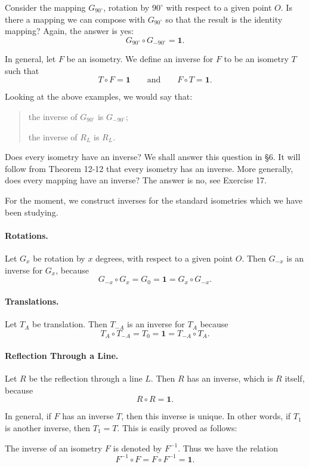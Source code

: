 \documentclass[12pt]{book} %
\begin{document}
\begin{ExerciseList}
Consider the mapping $G_{90^\circ}$, rotation by $90^\circ$ with respect to a given point $O$. Is there a mapping we can compose with $G_{90^\circ}$ so that the result is the identity mapping? Again, the answer is yes:
\[
G_{90^\circ}\circ G_{-90^\circ}=\mathbf{1}.
\]

In general, let $F$ be an isometry. We define an inverse for $F$ to be an isometry $T$ such that
\[
T\circ F=\mathbf{1}
\qquad \text{and} \qquad
F\circ T=\mathbf{1}.
\]

Looking at the above examples, we would say that:
\begin{quote}
the inverse of $G_{90^\circ}$ is $G_{-90^\circ}$;

the inverse of $R_L$ is $R_L$.
\end{quote}

Does every isometry have an inverse? We shall answer this question in \S6. It will follow from Theorem 12-12 that every isometry has an inverse. More generally, does every mapping have an inverse? The answer is no, see Exercise 17.

For the moment, we construct inverses for the standard isometries which we have been studying.

\paragraph{Rotations.}
Let $G_x$ be rotation by $x$ degrees, with respect to a given point $O$. Then $G_{-x}$ is an inverse for $G_x$, because
\[
G_{-x}\circ G_x=G_0=\mathbf{1}=G_x\circ G_{-x}.
\]

\paragraph{Translations.}
Let $T_A$ be translation. Then $T_{-A}$ is an inverse for $T_A$ because
\[
T_A\circ T_{-A}=T_0=\mathbf{1}=T_{-A}\circ T_A.
\]

\paragraph{Reflection Through a Line.}
Let $R$ be the reflection through a line $L$. Then $R$ has an inverse, which is $R$ itself, because
\[
R\circ R=\mathbf{1}.
\]

In general, if $F$ has an inverse $T$, then this inverse is unique. In other words, if $T_1$ is another inverse, then $T_1=T$. This is easily proved as follows:

The inverse of an isometry $F$ is denoted by $F^{-1}$. Thus we have the relation
\[
F^{-1}\circ F=F\circ F^{-1}=\mathbf{1}.
\]


\end{ExerciseList}
\end{document}
